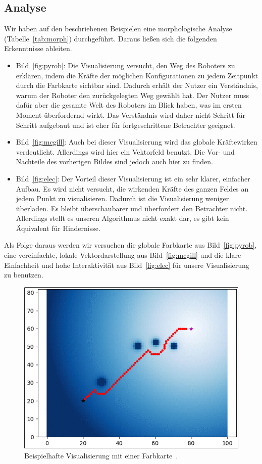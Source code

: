 \subsection{Analyse}
Wir haben auf den beschriebenen Beispielen eine morphologische Analyse (Tabelle~\vref{tab:morph}) durchgeführt. Daraus ließen sich die folgenden Erkenntnisse ableiten.
\begin{itemize}
    \item Bild~\vref{fig:pyrob}: Die Visualisierung versucht, den Weg des Roboters zu erklären, indem die Kräfte der möglichen Konfigurationen zu jedem Zeitpunkt durch die Farbkarte sichtbar sind. Dadurch erhält der Nutzer ein Verständnis, warum der Roboter den zurückgelegten Weg gewählt hat. Der Nutzer muss dafür aber die gesamte Welt des Roboters im Blick haben, was im ersten Moment überfordernd wirkt. Das Verständnis wird daher nicht Schritt für Schritt aufgebaut und ist eher für fortgeschrittene Betrachter geeignet.
    \item Bild~\vref{fig:mcgill}: Auch bei dieser Visualisierung wird das globale Kräftewirken verdeutlicht. Allerdings wird hier ein Vektorfeld benutzt. Die Vor- und Nachteile des vorherigen Bildes sind jedoch auch hier zu finden. 
    \item Bild~\vref{fig:elec}: Der Vorteil dieser Visualisierung ist ein sehr klarer, einfacher Aufbau. Es wird nicht versucht, die wirkenden Kräfte des ganzen Feldes an jedem Punkt zu visualisieren. Dadurch ist die Visualisierung weniger überladen. Es bleibt überschaubarer und überfordert den Betrachter nicht. Allerdings stellt es unseren Algorithmus nicht exakt dar, es gibt kein Äquivalent für Hindernisse.
\end{itemize}

Als Folge daraus werden wir versuchen die globale Farbkarte aus Bild~\vref{fig:pyrob}, eine vereinfachte, lokale Vektordarstellung aus Bild~\vref{fig:mcgill} und die klare Einfachheit und hohe Interaktivität aus Bild~\vref{fig:elec} für unsere Visualisierung zu benutzen.

\begin{figure}
  \centering
  \includegraphics[width=0.7\linewidth, height=0.7\linewidth]{img/pythonrobotics}
  \caption{Beispielhafte Visualisierung mit einer Farbkarte~\cite{PythonRobotics}.}
  \label{fig:pyrob}
\end{figure}


